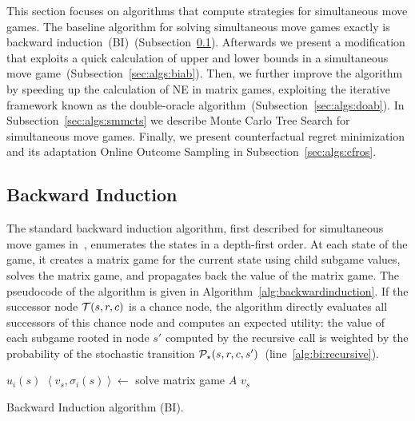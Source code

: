 
This section focuses on algorithms that compute strategies for simultaneous move games.
The baseline algorithm for solving simultaneous move games exactly is backward induction~(BI)~(Subsection~\ref{sec:algs:bi}).
Afterwards we present a modification that exploits a quick calculation of upper and lower bounds in a simultaneous move game~(Subsection~\ref{sec:algs:biab}).
Then, we further improve the algorithm by speeding up the calculation of NE in matrix games, exploiting the iterative framework known as the double-oracle algorithm~(Subsection~\ref{sec:algs:doab}).
In Subsection~\ref{sec:algs:smmcts} we describe Monte Carlo Tree Search for simultaneous move games.
Finally, we present counterfactual regret minimization and its adaptation Online Outcome Sampling in Subsection~\ref{sec:algs:cfros}.


\subsection{Backward Induction}\label{sec:algs:bi}

The standard backward induction algorithm, first described for simultaneous move games in~\cite{Ross71Goofspiel}, enumerates the states in a depth-first order. At each state of the game, it creates a matrix game for the current state using child subgame values, solves the matrix game, and propagates back the value of the matrix game. The pseudocode of the algorithm is given in Algorithm~\ref{alg:backwardinduction}. If the successor node $\mathcal{T}(s,r,c)$ is a chance node, the algorithm directly evaluates all successors of this chance node and computes an expected utility: the value of each subgame rooted in node $s'$ computed by the recursive call is weighted by the probability of the stochastic transition $\mathcal{P}_\star(s,r,c,s')$~(line~\ref{alg:bi:recursive}).

\begin{algorithm2e}[t]
\small
{}
 {\Return $u_i(s)$} \label{alg:bi:stop1}
$\left\langle v_s, \sigma_i(s) \right\rangle \leftarrow$ solve matrix game $A$\;  \label{alg:bi:solve}
\Return $v_s$ \label{alg:bi:stop2}
\caption{Backward Induction algorithm (BI).}\label{alg:backwardinduction}
\end{algorithm2e}

